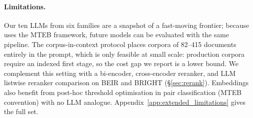 \paragraph{Limitations.}
\label{sec:limitations}
Our ten LLMs from six families are a snapshot of a fast-moving frontier; because \mteblm{} uses the MTEB framework, future models can be evaluated with the same pipeline.
The corpus-in-context protocol places corpora of 82--415 documents entirely in the prompt, which is only feasible at small scale: production corpora require an indexed first stage, so the cost gap we report is a lower bound.
We complement this setting with a bi-encoder, cross-encoder reranker, and LLM listwise reranker comparison on BEIR and BRIGHT (\S\ref{sec:rerank}).
Embeddings also benefit from post-hoc threshold optimisation in pair classification (MTEB convention) with no LLM analogue.
Appendix~\ref{app:extended_limitations} gives the full set.
